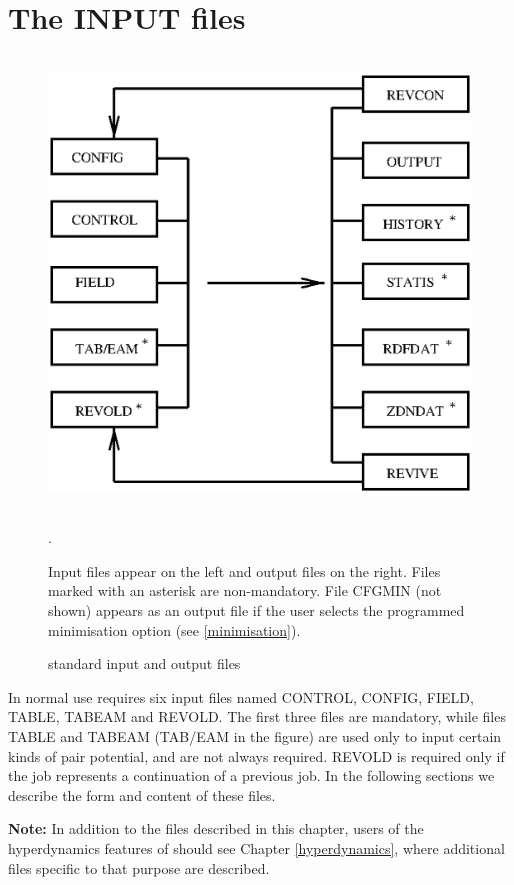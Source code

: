 
\section{The INPUT files}
\label{inputfiles}

\begin{figure}[ht]
\begin{center}
  \centerline{\includegraphics[height=12cm]{dlpoly.files.ps}}
\caption{\D{}  standard input and output files}. 
\end{center}
Input files appear on the left and output files on the right. Files
marked with an asterisk are non-mandatory. File CFGMIN (not shown)
appears as an output file if the user selects the programmed
minimisation option (see \ref{minimisation}).
\end{figure}

In normal use \D{} requires six input files named CONTROL, CONFIG, FIELD, TABLE,
TABEAM and REVOLD. The first three files are mandatory, while files TABLE and
TABEAM (TAB/EAM in the figure) are used only to input certain kinds of pair
potential, and are not always required.  REVOLD is required only if the job
represents a continuation of a previous job. In the following sections we
describe the form and content of these files.

{\bf Note:} In addition to the files described in this chapter, users of the
hyperdynamics features of \D{} should see Chapter \ref{hyperdynamics}, where
additional files specific to that purpose are described.

